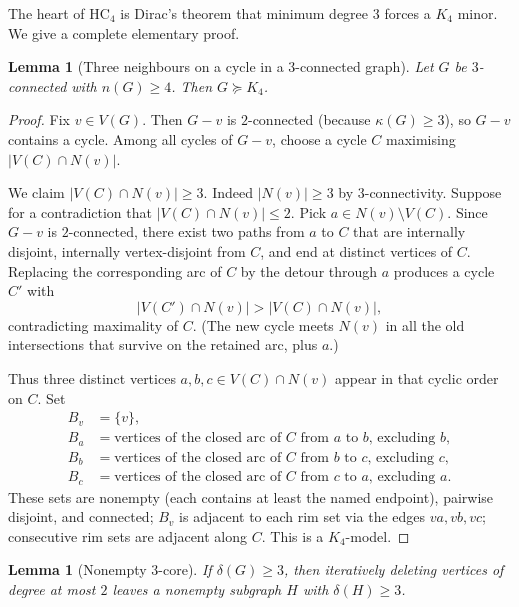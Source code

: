 \documentclass[11pt]{article}
\newtheorem{lemma}[theorem]{Lemma}
\theoremstyle{definition}
\begin{document}
The heart of \(\mathrm{HC}_4\) is Dirac's theorem that minimum degree \(3\) forces
a \(K_4\) minor. We give a complete elementary proof.

\begin{lemma}[Three neighbours on a cycle in a \(3\)-connected graph]
\label{lem:3conn-K4}
Let \(G\) be \(3\)-connected with \(n(G)\ge 4\). Then \(G\succcurlyeq K_4\).
\end{lemma}

\begin{proof}
Fix \(v\in V(G)\). Then \(G-v\) is \(2\)-connected (because \(\kappa(G)\ge 3\)), so
\(G-v\) contains a cycle. Among all cycles of \(G-v\), choose a cycle \(C\)
maximising \(|V(C)\cap N(v)|\).

We claim \(|V(C)\cap N(v)|\ge 3\). Indeed \(|N(v)|\ge 3\) by \(3\)-connectivity.
Suppose for a contradiction that \(|V(C)\cap N(v)|\le 2\). Pick
\(a\in N(v)\setminus V(C)\). Since \(G-v\) is \(2\)-connected, there exist two
paths from \(a\) to \(C\) that are internally disjoint, internally vertex-disjoint
from \(C\), and end at distinct vertices of \(C\). Replacing the corresponding
arc of \(C\) by the detour through \(a\) produces a cycle \(C'\) with
\[
|V(C')\cap N(v)|>|V(C)\cap N(v)|,
\]
contradicting maximality of \(C\). (The new cycle meets \(N(v)\) in all the old
intersections that survive on the retained arc, plus \(a\).)

Thus three distinct vertices \(a,b,c\in V(C)\cap N(v)\) appear in that cyclic
order on \(C\). Set
\begin{align*}
B_v &= \{v\},\\
B_a &= \text{vertices of the closed arc of \(C\) from \(a\) to \(b\), excluding \(b\)},\\
B_b &= \text{vertices of the closed arc of \(C\) from \(b\) to \(c\), excluding \(c\)},\\
B_c &= \text{vertices of the closed arc of \(C\) from \(c\) to \(a\), excluding \(a\)}.
\end{align*}
These sets are nonempty (each contains at least the named endpoint), pairwise
disjoint, and connected; \(B_v\) is adjacent to each rim set via the edges
\(va,vb,vc\); consecutive rim sets are adjacent along \(C\). This is a
\(K_4\)-model.
\end{proof}

\begin{lemma}[Nonempty \(3\)-core]\label{lem:3core}
If \(\delta(G)\ge 3\), then iteratively deleting vertices of degree at most \(2\)
leaves a nonempty subgraph \(H\) with \(\delta(H)\ge 3\).
\end{lemma}
\end{document}

